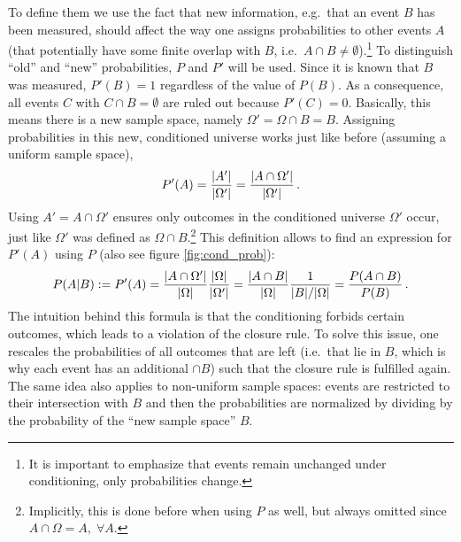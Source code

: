 To define them we use the fact that new information, e.g.~that an event $B$ has been measured, should affect the way one assigns probabilities to other events $A$ (that potentially have some finite overlap with $B$, i.e.~$A \cap B \neq \emptyset$).\footnote{It is important to emphasize that events remain unchanged under conditioning, only probabilities change.} To distinguish \enquote{old} and \enquote{new} probabilities, $P$ and $P'$ will be used. Since it is known that $B$ was measured, $P'(B) = 1$ regardless of the value of $P(B)$. As a consequence, all events $C$ with $C \cap B = \emptyset$ are ruled out because $P'(C) = 0$. Basically, this means there is a new sample space, namely $\Omega' = \Omega \cap B = B$. Assigning probabilities in this new, conditioned universe works just like before (assuming a uniform sample space),
\begin{equation*}
P'(A) = \frac{\abs{A'}}{\abs{\Omega'}} = \frac{\abs{A \cap \Omega'}}{\abs{\Omega'}} \, .
\end{equation*}
Using $A' = A \cap \Omega'$ ensures only outcomes in the conditioned universe $\Omega'$ occur, just like $\Omega'$ was defined as $\Omega \cap B$.\footnote{Implicitly, this is done before when using $P$ as well, but always omitted since $A \cap \Omega = A, \; \forall A$.}%
This definition allows to find an expression for $P'(A)$ using $P$ (also see figure \ref{fig:cond_prob}):
\begin{equation}
P(A | B) := P'(A) = \frac{\abs{A \cap \Omega'}}{\abs{\Omega}} \frac{\abs{\Omega}}{\abs{\Omega'}} = \frac{\abs{A \cap B}}{\abs{\Omega}} \frac{1}{\abs{B} / \abs{\Omega}} = \frac{P(A \cap B)}{P(B)} \, .
\end{equation}
The intuition behind this formula is that the conditioning forbids certain outcomes, which leads to a violation of the closure rule. To solve this issue, one rescales the probabilities of all outcomes that are left (i.e.~that lie in $B$, which is why each event has an additional $\cap B$) such that the closure rule is fulfilled again. The same idea also applies to non-uniform sample spaces: events are restricted to their intersection with $B$ and then the probabilities are normalized by dividing by the probability of the \enquote{new sample space} $B$.



